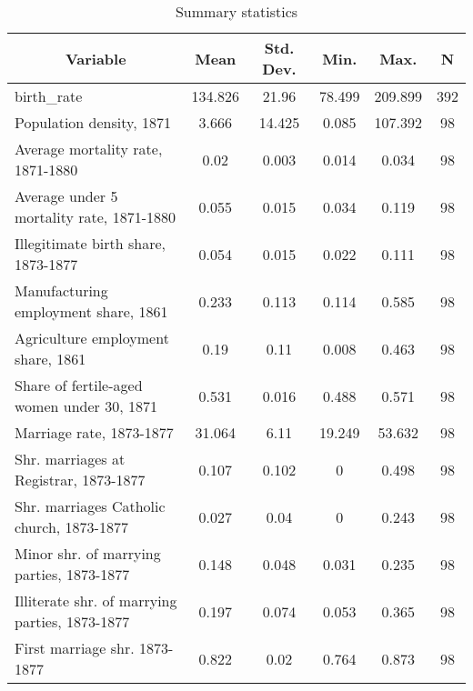 
\begin{table}[htbp]\centering \caption{Summary statistics \label{sumstat}}
\begin{tabular}{l c c c c c}\hline\hline
\multicolumn{1}{c}{\textbf{Variable}} & \textbf{Mean}
 & \textbf{Std. Dev.}& \textbf{Min.} &  \textbf{Max.} & \textbf{N}\\ \hline
birth\_rate & 134.826 & 21.96 & 78.499 & 209.899 & 392\\
Population density, 1871 & 3.666 & 14.425 & 0.085 & 107.392 & 98\\
Average mortality rate, 1871-1880 & 0.02 & 0.003 & 0.014 & 0.034 & 98\\
Average under 5 mortality rate, 1871-1880 & 0.055 & 0.015 & 0.034 & 0.119 & 98\\
Illegitimate birth share, 1873-1877 & 0.054 & 0.015 & 0.022 & 0.111 & 98\\
Manufacturing employment share, 1861 & 0.233 & 0.113 & 0.114 & 0.585 & 98\\
Agriculture employment share, 1861 & 0.19 & 0.11 & 0.008 & 0.463 & 98\\
Share of fertile-aged women under 30, 1871 & 0.531 & 0.016 & 0.488 & 0.571 & 98\\
Marriage rate, 1873-1877 & 31.064 & 6.11 & 19.249 & 53.632 & 98\\
Shr. marriages at Registrar, 1873-1877 & 0.107 & 0.102 & 0 & 0.498 & 98\\
Shr. marriages Catholic church, 1873-1877 & 0.027 & 0.04 & 0 & 0.243 & 98\\
Minor shr. of marrying parties, 1873-1877 & 0.148 & 0.048 & 0.031 & 0.235 & 98\\
Illiterate shr. of marrying parties, 1873-1877 & 0.197 & 0.074 & 0.053 & 0.365 & 98\\
First marriage shr. 1873-1877 & 0.822 & 0.02 & 0.764 & 0.873 & 98\\
\hline\end{tabular}
\end{table}
